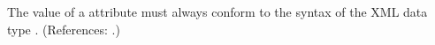 The value of a  attribute must always conform to the syntax
of the XML data type .  (References: .)

